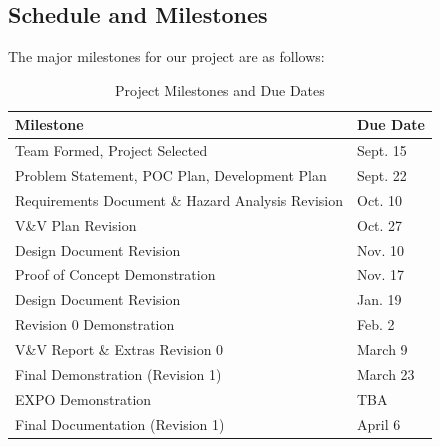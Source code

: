\documentclass{article}
\begin{document}
\subsection{Schedule and Milestones}\label{subsec:schedule}
\medskip
The major milestones for our project are as follows:
\begin{table}[H]
  \centering
  \begin{tabular}{|l|l|}
  \hline
  \textbf{Milestone} & \textbf{Due Date} \\ \hline
  Team Formed, Project Selected & Sept. 15 \\ \hline
  Problem Statement, POC Plan, Development Plan & Sept. 22 \\ \hline
  Requirements Document \& Hazard Analysis Revision & Oct. 10 \\ \hline
  V\&V Plan Revision & Oct. 27 \\ \hline
  Design Document Revision & Nov. 10 \\ \hline
  Proof of Concept Demonstration & Nov. 17 \\ \hline
  Design Document Revision & Jan. 19 \\ \hline
  Revision 0 Demonstration & Feb. 2 \\ \hline
  V\&V Report \& Extras Revision 0 & March 9 \\ \hline
  Final Demonstration (Revision 1) & March 23 \\ \hline
  EXPO Demonstration & TBA \\ \hline
  Final Documentation (Revision 1) & April 6 \\ \hline
  
  \end{tabular}
  \caption{Project Milestones and Due Dates}
  \label{tab:project-milestones}
  \end{table}
\end{document}
